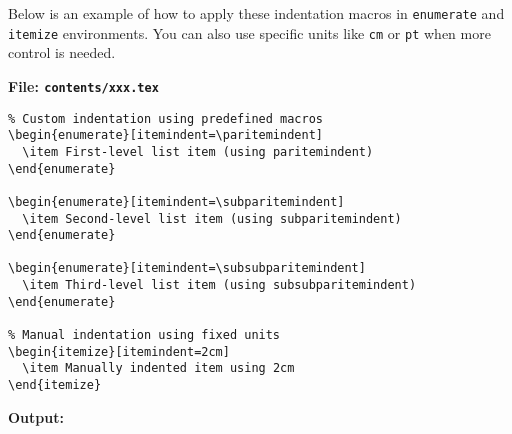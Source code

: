\documentclass{VISTEC}
\begin{document}
\begin{paragraph}
Below is an example of how to apply these indentation macros in \texttt{enumerate} and \texttt{itemize} environments. You can also use specific units like \texttt{cm} or \texttt{pt} when more control is needed.
\end{paragraph}
\newpage

\noindent\textbf{File: \texttt{contents/xxx.tex}}\vspace{-1.5em}
\begin{verbatim}
% Custom indentation using predefined macros
\begin{enumerate}[itemindent=\paritemindent]
  \item First-level list item (using paritemindent)
\end{enumerate}

\begin{enumerate}[itemindent=\subparitemindent]
  \item Second-level list item (using subparitemindent)
\end{enumerate}

\begin{enumerate}[itemindent=\subsubparitemindent]
  \item Third-level list item (using subsubparitemindent)
\end{enumerate}

% Manual indentation using fixed units
\begin{itemize}[itemindent=2cm]
  \item Manually indented item using 2cm
\end{itemize}

\end{verbatim}

\textbf{Output:}\vspace{0.5em}
\end{document}
